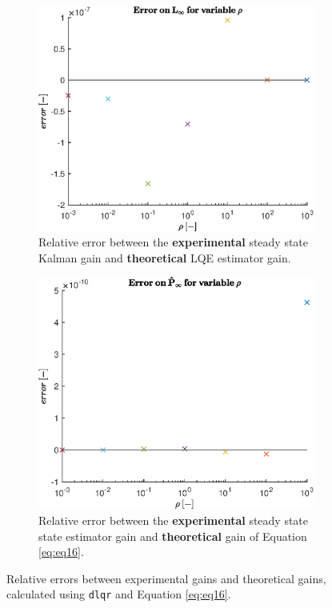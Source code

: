 \documentclass[a4paper,kul]{kulakarticle} %
\begin{document}
\begin{figure}[htp!]
	\centering
	\begin{subfigure}[b]{0.48\textwidth}
		\centering
		\includegraphics[width=\linewidth]{error_L.eps}
		\caption{Relative error between the \textbf{experimental} steady state Kalman gain and \textbf{theoretical} LQE estimator gain.}
		\label{fig:error_L}
	\end{subfigure}
	\hfill
	\begin{subfigure}[b]{0.48\textwidth}  
		\centering 
		\includegraphics[width=\linewidth]{error_P.eps}
		\caption{Relative error between the \textbf{experimental} steady state state estimator gain and \textbf{theoretical} gain of Equation \ref{eq:eq16}.}
		\label{fig:error_P}
	\end{subfigure}
	\caption{Relative errors between experimental gains and theoretical gains, calculated using \texttt{dlqr} and Equation \ref{eq:eq16}.} 
	\label{error2}
\end{figure}
\end{document}
